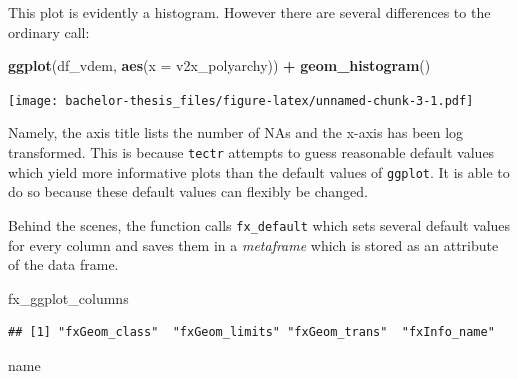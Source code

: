 \documentclass[]{report}
\newenvironment{Shaded}{\begin{snugshade}}{\end{snugshade}}
\newcommand{\KeywordTok}[1]{\textcolor[rgb]{0.13,0.29,0.53}{\textbf{#1}}}
\newcommand{\DataTypeTok}[1]{\textcolor[rgb]{0.13,0.29,0.53}{#1}}
\newcommand{\DecValTok}[1]{\textcolor[rgb]{0.00,0.00,0.81}{#1}}
\newcommand{\StringTok}[1]{\textcolor[rgb]{0.31,0.60,0.02}{#1}}
\newcommand{\OperatorTok}[1]{\textcolor[rgb]{0.81,0.36,0.00}{\textbf{#1}}}
\newcommand{\NormalTok}[1]{#1}
\theoremstyle{definition}
\theoremstyle{definition}
\theoremstyle{definition}
\theoremstyle{remark}
\begin{document}
This plot is evidently a histogram. However there are several
differences to the ordinary call:

\begin{Shaded}
\begin{Highlighting}[]
\KeywordTok{ggplot}\NormalTok{(df_vdem, }\KeywordTok{aes}\NormalTok{(}\DataTypeTok{x =}\NormalTok{ v2x_polyarchy)) }\OperatorTok{+}\StringTok{ }\KeywordTok{geom_histogram}\NormalTok{()}
\end{Highlighting}
\end{Shaded}

\texttt{[image: bachelor-thesis\_files/figure-latex/unnamed-chunk-3-1.pdf]}

Namely, the axis title lists the number of NAs and the x-axis has been
log transformed. This is because \texttt{tectr} attempts to guess
reasonable default values which yield more informative plots than the
default values of \texttt{ggplot}. It is able to do so because these
default values can flexibly be changed.

Behind the scenes, the function calls \texttt{fx\_default} which sets
several default values for every column and saves them in a
\emph{metaframe} which is stored as an attribute of the data frame.

\begin{Shaded}
\begin{Highlighting}[]
\NormalTok{fx_ggplot_columns}
\end{Highlighting}
\end{Shaded}

\begin{verbatim}
## [1] "fxGeom_class"  "fxGeom_limits" "fxGeom_trans"  "fxInfo_name"
\end{verbatim}

\begin{Shaded}
\end{Shaded}

name
\end{document}
